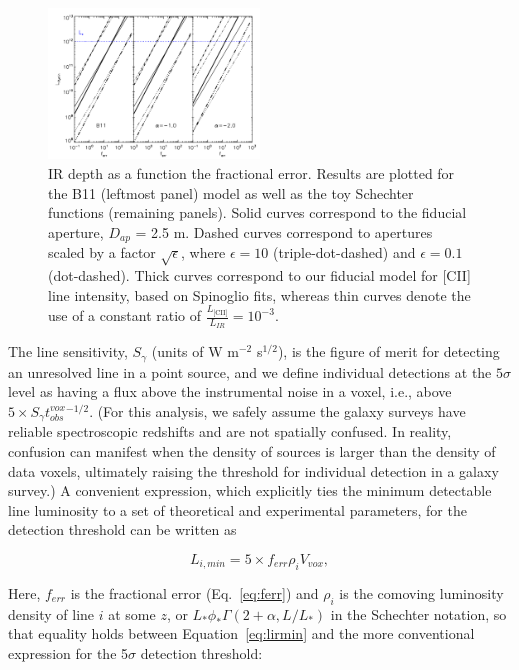 \documentclass[iop]{emulateapj}
\begin{document}
\begin{figure}
\centering
\includegraphics[width=0.5\textwidth]{lirmin_ferr_b11_alpham1p0_alpham2p0_lstar1d12}
\caption{IR depth as a function the fractional error. Results are plotted for the B11 (leftmost panel) model as well as the toy Schechter functions (remaining panels). Solid curves correspond to the fiducial aperture, $D_{ap}$ = 2.5 m. Dashed curves correspond to apertures scaled by a factor $\sqrt{\epsilon}$, where $\epsilon=10$ (triple-dot-dashed) and $\epsilon=0.1$ (dot-dashed). Thick curves correspond to our fiducial model for [CII] line intensity, based on Spinoglio fits, whereas thin curves denote the use of a constant ratio of $\frac{L_{\textrm{[CII]}}}{L_{IR}} = 10^{-3}$.}
\label{fig:lirmin_ferr}
\end{figure}

The line sensitivity, $S_{\gamma}$ (units of W m$^{-2}$ s$^{1/2}$), is the figure of merit for detecting an unresolved line in a point source, and we define individual detections at the $5\sigma$ level as having a flux above the instrumental noise in a voxel, i.e., above $5 \times S_{\gamma} t_{obs}^{vox}^{-1/2}$. (For this analysis, we safely assume the galaxy surveys have reliable spectroscopic redshifts and are not spatially confused. In reality, confusion can manifest when the density of sources is larger than the density of data voxels, ultimately raising the threshold for individual detection in a galaxy survey.) A convenient expression, which explicitly ties the minimum detectable line luminosity to a set of theoretical and experimental parameters, for the detection threshold can be written as

\begin{equation}
L_{i, min} = 5 \times f_{err} \rho_{i} V_{vox}, 
\label{eq:lirmin}
\end{equation}

Here, $f_{err}$ is the fractional error (Eq.~\ref{eq:ferr}) and $\rho_{i}$ is the comoving luminosity density of line $i$ at some $z$, or $L_*\phi_* \Gamma(2+\alpha, L/L_*)$ in the Schechter notation, so that equality holds between Equation~\ref{eq:lirmin} and the more conventional expression for the 5$\sigma$ detection threshold:
\end{document}
